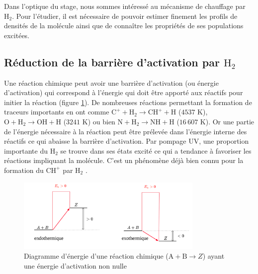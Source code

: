 Dans l'optique du stage, nous sommes intéressé au mécanisme de chauffage par $\mathrm{H}_2$. Pour l'étudier, il est nécessaire de pouvoir estimer finement les profils de densités de la molécule ainsi que de connaître les propriétés de ses populations excitées. 


\subsection{Réduction de la barrière d'activation par $\mathrm{H}_2$}

Une réaction chimique peut avoir une barrière d'activation (ou énergie d'activation) qui correspond à l'énergie qui doit être apporté aux réactifs pour initier la réaction (figure \ref{fig:H2:Ea}). De nombreuses réactions permettant la formation de traceurs importants en ont comme $\mathrm{C}^+ + \mathrm{H}_2 \rightarrow \mathrm{CH}^+ + \mathrm{H}$ ($4537$ K),  $\mathrm{O} + \mathrm{H}_2 \rightarrow \mathrm{OH} + \mathrm{H}$  ($3241$ K) ou bien $\mathrm{N} + \mathrm{H}_2 \rightarrow \mathrm{NH} + \mathrm{H}$ ($16\,607$ K). Or une partie de l'énergie nécessaire à la réaction peut être prélevée dans l'énergie interne des réactifs ce qui abaisse la barrière d'activation. Par pompage UV, une proportion importante du $\mathrm{H}_2$ se trouve dans ses états excité ce qui a tendance à favoriser les réactions impliquant la molécule. C'est un phénomène déjà bien connu pour la formation du $\mathrm{CH}^+$ par $\mathrm{H}_2$ \cite{Herraez, Zanchet}.


\begin{figure}[!h]
    \centering
    \includegraphics[trim = {0 0 0 0cm },clip,width=0.8\textwidth]{figure/type46/Ea.pdf}
    \caption{Diagramme d'énergie d'une réaction chimique ($\mathrm{A}+\mathrm{B}\rightarrow Z$) ayant une énergie d'activation non nulle}
    \label{fig:H2:Ea}
\end{figure}

